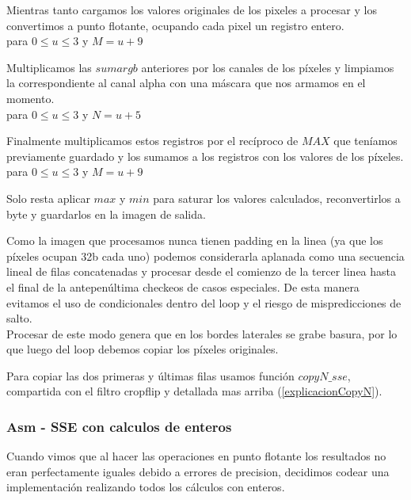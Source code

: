 Mientras tanto cargamos los valores originales de los pixeles a procesar y los convertimos a punto flotante, ocupando cada pixel un registro entero. \\

 
para $0 \le u \le 3$ y $M = u+9$

Multiplicamos las $sumargb$ anteriores por los canales de los píxeles y limpiamos la correspondiente al canal alpha con una máscara que nos armamos en el momento. \\

 
para $0 \le u \le 3$ y $N = u+5$

Finalmente multiplicamos estos registros por el recíproco de $MAX$ que teníamos previamente guardado y los sumamos a los registros con los valores de los píxeles. \\

 
para $0 \le u \le 3$ y $M = u+9$

Solo resta aplicar $max$ y $min$ para saturar los valores calculados, reconvertirlos a byte y guardarlos en la imagen de salida.

\vspace{10 mm}

Como la imagen que procesamos nunca tienen padding en la linea (ya que los píxeles ocupan 32b cada uno) podemos considerarla aplanada como una secuencia lineal de filas concatenadas y procesar desde el comienzo de la tercer linea hasta el final de la antepenúltima checkeos de casos especiales.
De esta manera evitamos el uso de condicionales dentro del loop y el riesgo de mispredicciones de salto. \\
Procesar de este modo genera que en los bordes laterales se grabe basura, por lo que luego del loop debemos copiar los píxeles originales.

Para copiar las dos primeras y últimas filas usamos función $copyN\_sse$, compartida con el filtro cropflip y detallada mas arriba (\ref{explicacionCopyN}).

\subsubsection{Asm - SSE con calculos de enteros}

Cuando vimos que al hacer las operaciones en punto flotante los resultados no eran perfectamente iguales debido a errores de precision, decidimos codear una implementación realizando todos los cálculos con enteros.

